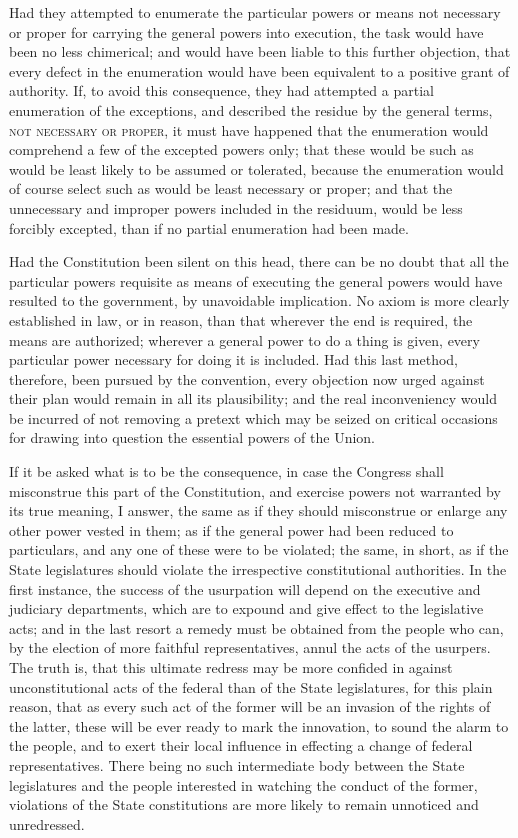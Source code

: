 Had they attempted to enumerate the particular powers or means not necessary or proper for carrying the general powers into execution, the task would have been no less chimerical; and would have been liable to this further objection, that every defect in the enumeration would have been equivalent to a positive grant of authority. If, to avoid this consequence, they had attempted a partial enumeration of the exceptions, and described the residue by the general terms, \textsc{not necessary or proper}, it must have happened that the enumeration would comprehend a few of the excepted powers only; that these would be such as would be least likely to be assumed or tolerated, because the enumeration would of course select such as would be least necessary or proper; and that the unnecessary and improper powers included in the residuum, would be less forcibly excepted, than if no partial enumeration had been made.

Had the Constitution been silent on this head, there can be no doubt that all the particular powers requisite as means of executing the general powers would have resulted to the government, by unavoidable implication. No axiom is more clearly established in law, or in reason, than that wherever the end is required, the means are authorized; wherever a general power to do a thing is given, every particular power necessary for doing it is included. Had this last method, therefore, been pursued by the convention, every objection now urged against their plan would remain in all its plausibility; and the real inconveniency would be incurred of not removing a pretext which may be seized on critical occasions for drawing into question the essential powers of the Union.

If it be asked what is to be the consequence, in case the Congress shall misconstrue this part of the Constitution, and exercise powers not warranted by its true meaning, I answer, the same as if they should misconstrue or enlarge any other power vested in them; as if the general power had been reduced to particulars, and any one of these were to be violated; the same, in short, as if the State legislatures should violate the irrespective constitutional authorities. In the first instance, the success of the usurpation will depend on the executive and judiciary departments, which are to expound and give effect to the legislative acts; and in the last resort a remedy must be obtained from the people who can, by the election of more faithful representatives, annul the acts of the usurpers. The truth is, that this ultimate redress may be more confided in against unconstitutional acts of the federal than of the State legislatures, for this plain reason, that as every such act of the former will be an invasion of the rights of the latter, these will be ever ready to mark the innovation, to sound the alarm to the people, and to exert their local influence in effecting a change of federal representatives. There being no such intermediate body between the State legislatures and the people interested in watching the conduct of the former, violations of the State constitutions are more likely to remain unnoticed and unredressed.

